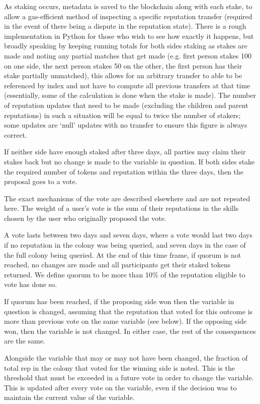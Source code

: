 As staking occurs, metadata is saved to the blockchain along with each stake, to allow a gas-efficient method of inspecting a specific reputation transfer (required in the event of there being a dispute in the reputation state). There is a rough implementation in Python for those who wish to see how exactly it happens, but broadly speaking by keeping running totals for both sides staking as stakes are made and noting any partial matches that get made (e.g. first person stakes 100 on one side, the next person stakes 50 on the other, the first person has their stake partially unmatched), this allows for an arbitrary transfer to able to be referenced by index and not have to compute all previous transfers at that time (essentially, some of the calculation is done when the stake is made).  The number of reputation updates that need to be made (excluding the children and parent reputations) in such a situation will be equal to twice the number of stakers; some updates are `null' updates with no transfer to ensure this figure is always correct.

If neither side have enough staked after three days, all parties may claim their stakes back but no change is made to the variable in question. If both sides stake the required number of tokens and reputation within the three days, then the proposal goes to a vote.

The exact mechanisms of the vote are described elsewhere and are not repeated here. The weight of a user's vote is the sum of their reputations in the skills chosen by the user who originally proposed the vote.

A vote lasts between two days and seven days, where a vote would last two days if no reputation in the colony was being queried, and seven days in the case of the full colony being queried. At the end of this time frame, if quorum is not reached, no changes are made and all participants get their staked tokens returned. We define quorum to be more than 10\% of the reputation eligible to vote has done so.

If quorum has been reached, if the proposing side won then the variable in question is changed, assuming that the reputation that voted for this outcome is more than previous vote on the same variable (see below). If the opposing side won, then the variable is not changed. In either case, the rest of the consequences are the same.

Alongside the variable that may or may not have been changed, the fraction of total rep in the colony that voted for the winning side is noted. This is the threshold that must be exceeded in a future vote in order to change the variable. This is updated after every vote on the variable, even if the decision was to maintain the current value of the variable.

